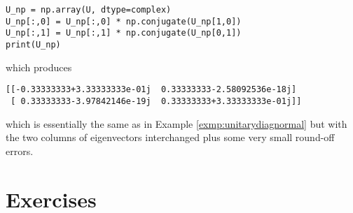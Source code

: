 \begin{lstlisting}
U_np = np.array(U, dtype=complex)
U_np[:,0] = U_np[:,0] * np.conjugate(U_np[1,0])
U_np[:,1] = U_np[:,1] * np.conjugate(U_np[0,1])
print(U_np)
\end{lstlisting}
which produces
\begin{lstlisting}
[[-0.33333333+3.33333333e-01j  0.33333333-2.58092536e-18j]
 [ 0.33333333-3.97842146e-19j  0.33333333+3.33333333e-01j]]    
\end{lstlisting}
which is essentially the same as in Example \ref{exmp:unitarydiagnormal} but with the two columns of eigenvectors interchanged plus some very small round-off errors.

\section{Exercises}

